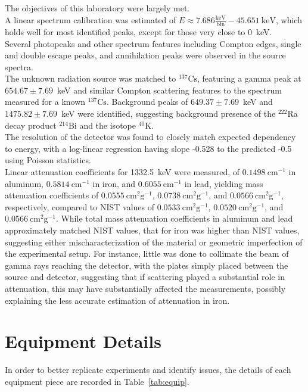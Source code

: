 \documentclass[12pt]{article}
\newcommand{\CsSrc}{\xspace$\mathrm{^{137}Cs}$\xspace}
\begin{document}
The objectives of this laboratory were largely met.\\

A linear spectrum calibration was estimated of $E\approx 7.686\mathrm{\frac{keV}{bin}} - 45.651~\mathrm{keV}$, which holds well for most identified peaks, except for those very close to 0~keV.\\

Several photopeaks and other spectrum features including Compton edges, single and double escape peaks, and annihilation peaks were observed in the source spectra.\\

The unknown radiation source was matched to \CsSrc, featuring a gamma peak at $654.67\pm7.69$~keV and similar Compton scattering features to the spectrum measured for a known \CsSrc.
Background peaks of $649.37\pm7.69$~keV and $1475.82\pm7.69$~keV were identified, suggesting background presence of the $^{222}$Ra decay product $^{214}$Bi and the isotope $^{40}$K.\\

The resolution of the detector was found to closely match expected dependency to energy, with a log-linear regression having slope -0.528 to the predicted -0.5 using Poisson statistics.\\

Linear attenuation coefficients for 1332.5~keV were measured, of $0.1498~\mathrm{cm^{-1}}$ in aluminum, $0.5814~\mathrm{cm^{-1}}$ in iron, and $0.6055~\mathrm{cm^{-1}}$ in lead, yielding mass attenuation coefficients of $0.0555~\mathrm{cm^2g^{-1}}$, $0.0738~\mathrm{cm^2g^{-1}}$, and $0.0566~\mathrm{cm^2g^{-1}}$, respectively, compared to NIST values of $0.0533~\mathrm{cm^2g^{-1}}$, $0.0520~\mathrm{cm^2g^{-1}}$, and $0.0566~\mathrm{cm^2g^{-1}}$.
While total mass attenuation coefficients in aluminum and lead approximately matched NIST values, that for iron was higher than NIST values, suggesting either mischaracterization of the material or geometric imperfection of the experimental setup.
For instance, little was done to collimate the beam of gamma rays reaching the detector, with the plates simply placed between the source and detector, suggesting that if scattering played a substantial role in attenuation, this may have substantially affected the measurements, possibly explaining the less accurate estimation of attenuation in iron.

% 
\pagebreak\printbibliography

\appendix
\pagebreak
\FloatBarrier\section{Equipment Details}\label{app:equip}
In order to better replicate experiments and identify issues, the details of each equipment piece are recorded in Table~\ref{tab:equip}.
\end{document}
